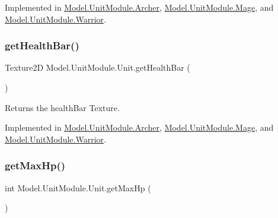 Implemented in \hyperlink{class_model_1_1_unit_module_1_1_archer_a470c428226089a8872e1bc3901388196}{Model.\+Unit\+Module.\+Archer}, \hyperlink{class_model_1_1_unit_module_1_1_mage_a97144d7360321515956ebb92e8bd0caf}{Model.\+Unit\+Module.\+Mage}, and \hyperlink{class_model_1_1_unit_module_1_1_warrior_a881ad4fa5437c4353abd62a56d0ab37d}{Model.\+Unit\+Module.\+Warrior}.

\hypertarget{interface_model_1_1_unit_module_1_1_unit_a5be18da3857bb22525feb89dd49b76b1}{}\label{interface_model_1_1_unit_module_1_1_unit_a5be18da3857bb22525feb89dd49b76b1} 
\subsubsection{\texorpdfstring{get\+Health\+Bar()}{getHealthBar()}}
{\footnotesize\ttfamily Texture2D Model.\+Unit\+Module.\+Unit.\+get\+Health\+Bar (\begin{DoxyParamCaption}{ }\end{DoxyParamCaption})}

Returns the health\+Bar Texture. 

Implemented in \hyperlink{class_model_1_1_unit_module_1_1_archer_a113518d26ecdbf45aca30fed1f884b3b}{Model.\+Unit\+Module.\+Archer}, \hyperlink{class_model_1_1_unit_module_1_1_mage_af816450e9803b56a1bf97bb9f04c2008}{Model.\+Unit\+Module.\+Mage}, and \hyperlink{class_model_1_1_unit_module_1_1_warrior_a4a2706ae17e29c3c22c30b057786e63f}{Model.\+Unit\+Module.\+Warrior}.

\hypertarget{interface_model_1_1_unit_module_1_1_unit_adee907637c0ce8487149ae4549fb4cf1}{}\label{interface_model_1_1_unit_module_1_1_unit_adee907637c0ce8487149ae4549fb4cf1} 
\subsubsection{\texorpdfstring{get\+Max\+Hp()}{getMaxHp()}}
{\footnotesize\ttfamily int Model.\+Unit\+Module.\+Unit.\+get\+Max\+Hp (\begin{DoxyParamCaption}{ }\end{DoxyParamCaption})}

